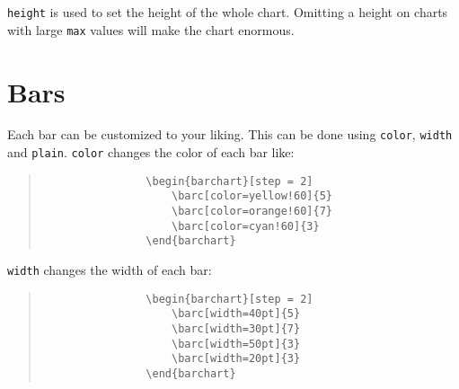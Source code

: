 \documentclass[]{article}
\begin{document}
\texttt{height} is used to set the height of the whole chart. Omitting a height on charts with large \texttt{max} values will make the chart enormous.

\section{Bars}
Each bar can be customized to your liking. This can be done using \texttt{color}, \texttt{width} and \texttt{plain}.
\texttt{color} changes the color of each bar like:


\begin{center}
	\begin{minipage}[l][][c]{0.45\linewidth} 
		\begin{quote}\small
			\begin{verbatim}
				\begin{barchart}[step = 2]    
				    \barc[color=yellow!60]{5}
				    \barc[color=orange!60]{7}
				    \barc[color=cyan!60]{3}
				\end{barchart}
			\end{verbatim}
		\end{quote}
		\end{minipage}
		\quad
		\begin{minipage}[r][][c]{0.45\linewidth}
		\begin{barchart}[step = 2]
		\end{barchart}
	\end{minipage}
\end{center}

\texttt{width} changes the width of each bar:

\begin{center}
	\begin{minipage}[l][][c]{0.45\linewidth} 
		\begin{quote}\small
			\begin{verbatim}
				\begin{barchart}[step = 2]
				    \barc[width=40pt]{5}
				    \barc[width=30pt]{7}
				    \barc[width=50pt]{3}
				    \barc[width=20pt]{3}
				\end{barchart}
			\end{verbatim}
		\end{quote}
		\end{minipage}
		\quad
		\begin{minipage}[r][][c]{0.45\linewidth}
		\begin{barchart}[step = 2]
		\end{barchart}
	\end{minipage}
\end{center}
\end{document}
